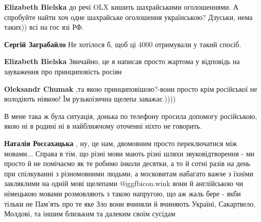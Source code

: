 \begin{itemize}
\begin{itemize}
\textbf{Elizabeth Bielska} до речі OLX кишить шахрайськими оголошеннями. А спробуйте найти хоч одне шахрайське оголошення українською? Дзуськи, нема таких)) всі на гос язі РФ.

 
\textbf{Сергій Заграбайло} Не хотілося б, щоб ці 4000 отримували у такий спосіб.

 
\textbf{Elizabeth Bielska} Звичайно, це я написав просто жартома у відповідь на зауваження про принциповість росіян \Smiley[1.0][yellow]

 
\textbf{Oleksandr Chumak} ,та якою принциповішою?-вони просто крім російської не володіють ніякою! Їм рузькоізична щелепа заважає.))))

 
В мене така ж була ситуація, донька по телефону просила допомогу російською, якою ні в родині ні в найближчому оточенні ніхто не говорить.

 
\textbf{Наталія Россахацька} , ну, це нам, двомовним просто переключатися між
мовами... Справа в тім, що різні мови мають різні шляхи звуковідтворення - ми
просто й не помічаємо як те робимо інколи десятки, а то й сотні разів на день
при спілкуванні з різномовними людьми, а московитам набагато важче з їхніми
закляклими на одній мові щелепами @igg{fbicon.wink} вони й англійською чи німецькою мовами
розмовляють з такою напругою, що аж жаль бере - якби тільки не Пам'ять про те
яке Зло вони вчиняли й вчиняють Україні, Сакартвело, Молдові, та іншим близьким
та далеким своїм сусідам 🙁
\end{itemize}


\end{itemize}
